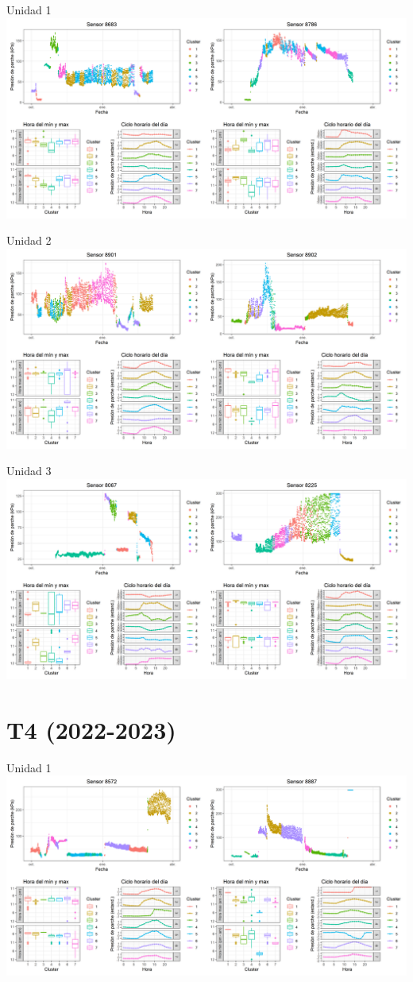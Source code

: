 \documentclass[
  letterpaper,
  DIV=11,
  numbers=noendperiod]{scrreprt}
\begin{document}
Unidad 1
\includegraphics{figuras/01_turgor_sensor/2022_2023_Rio_Claro_T3_Unidad_1.png}

Unidad 2
\includegraphics{figuras/01_turgor_sensor/2022_2023_Rio_Claro_T3_Unidad_2.png}

Unidad 3
\includegraphics{figuras/01_turgor_sensor/2022_2023_Rio_Claro_T3_Unidad_3.png}

\chapter{T4 (2022-2023)}

Unidad 1
\includegraphics{figuras/01_turgor_sensor/2022_2023_Rio_Claro_T4_Unidad_1.png}
\end{document}
